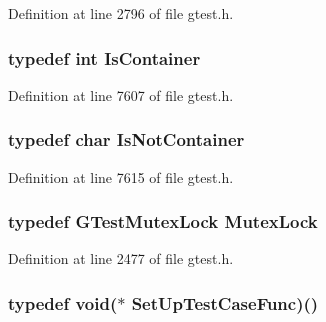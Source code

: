 \-Definition at line 2796 of file gtest.\-h.

\hypertarget{namespacetesting_1_1internal_a352c9f642298e3ae8c7eb84e3278ba65}{
\subsubsection[{\-Is\-Container}]{\setlength{\rightskip}{0pt plus 5cm}typedef int {\bf \-Is\-Container}}}\label{d0/da7/namespacetesting_1_1internal_a352c9f642298e3ae8c7eb84e3278ba65}


\-Definition at line 7607 of file gtest.\-h.

\hypertarget{namespacetesting_1_1internal_a7702df52e064b640254945414578e90c}{
\subsubsection[{\-Is\-Not\-Container}]{\setlength{\rightskip}{0pt plus 5cm}typedef char {\bf \-Is\-Not\-Container}}}\label{d0/da7/namespacetesting_1_1internal_a7702df52e064b640254945414578e90c}


\-Definition at line 7615 of file gtest.\-h.

\hypertarget{namespacetesting_1_1internal_a0ceb93bd27638edfa3ced2469951fd99}{
\subsubsection[{\-Mutex\-Lock}]{\setlength{\rightskip}{0pt plus 5cm}typedef {\bf \-G\-Test\-Mutex\-Lock} {\bf \-Mutex\-Lock}}}\label{d0/da7/namespacetesting_1_1internal_a0ceb93bd27638edfa3ced2469951fd99}


\-Definition at line 2477 of file gtest.\-h.

\hypertarget{namespacetesting_1_1internal_abdd2548fdbf05907e439e416dab030ec}{
\subsubsection[{\-Set\-Up\-Test\-Case\-Func}]{\setlength{\rightskip}{0pt plus 5cm}typedef void($\ast$ {\bf \-Set\-Up\-Test\-Case\-Func})()}}\label{d0/da7/namespacetesting_1_1internal_abdd2548fdbf05907e439e416dab030ec}


